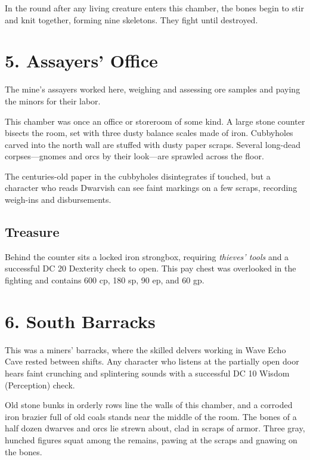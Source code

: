 \documentclass[10pt,a4paper,twoside,bg=print,twocolumn,openany,nodeprecatedcode]{dndbook}
\begin{document}
In the round after any living creature enters this chamber, the bones begin to stir and knit together, forming nine skeletons. They fight until destroyed.

\section{5. Assayers' Office}
The mine's assayers worked here, weighing and assessing ore samples and paying the minors for their labor.

\begin{DndReadAloud}{}
This chamber was once an office or storeroom of some kind. A large stone counter bisects the room, set with three dusty balance scales made of iron. Cubbyholes carved into the north wall are stuffed with dusty paper scraps. Several long-dead corpses—gnomes and orcs by their look—are sprawled across the floor.

\end{DndReadAloud}

The centuries-old paper in the cubbyholes disintegrates if touched, but a character who reads Dwarvish can see faint markings on a few scraps, recording weigh-ins and disbursements.

\subsection{Treasure}
Behind the counter sits a locked iron strongbox, requiring \textit{thieves' tools} and a successful DC 20 Dexterity check to open. This pay chest was overlooked in the fighting and contains 600 cp, 180 sp, 90 ep, and 60 gp.

\section{6. South Barracks}
This was a miners' barracks, where the skilled delvers working in Wave Echo Cave rested between shifts. Any character who listens at the partially open door hears faint crunching and splintering sounds with a successful DC 10 Wisdom (Perception) check.

\begin{DndReadAloud}{}
Old stone bunks in orderly rows line the walls of this chamber, and a corroded iron brazier full of old coals stands near the middle of the room. The bones of a half dozen dwarves and orcs lie strewn about, clad in scraps of armor. Three gray, hunched figures squat among the remains, pawing at the scraps and gnawing on the bones.

\end{DndReadAloud}
\end{document}

